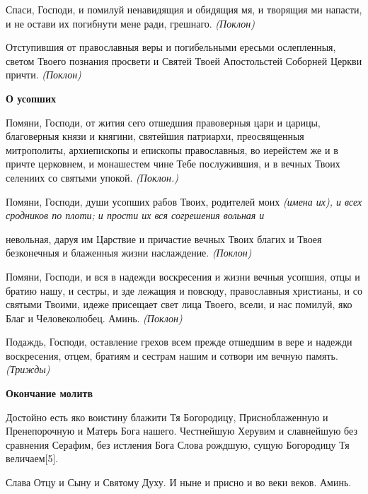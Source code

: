    Спаси, Господи, и помилуй ненавидящия и обидящия мя, и творящия ми
напасти, и не остави их погибнути мене ради, грешнаго. \itshape  (Поклон)\normalfont{}



   Отступившия от православныя веры и погибельными ересьми
ослепленныя, светом Твоего познания просвети и Святей Твоей Апостольстей
Соборней Церкви причти. \itshape  (Поклон) \normalfont{}



 

\bfseries О усопших\normalfont{}


   Помяни, Господи, от жития сего отшедшия правоверныя цари и царицы,
благоверныя князи и княгини, святейшия патриархи, преосвященныя
митрополиты, архиепископы и епископы православныя, во иерейстем же и в
причте церковнем, и монашестем чине Тебе послужившия, и в вечных Твоих
селениих со святыми упокой. \itshape  (Поклон.)\normalfont{}



   Помяни, Господи, души усопших рабов Твоих, родителей моих \itshape  (имена
их)\normalfont{}, и всех сродников по плоти; и прости их вся согрешения вольная и

невольная, даруя им Царствие и причастие вечных Твоих благих
и Твоея безконечныя и блаженныя жизни наслаждение. \itshape  (Поклон)
\normalfont{}



   Помяни, Господи, и вся в надежди воскресения и жизни вечныя усопшия,
отцы и братию нашу, и сестры, и зде лежащия и повсюду, православныя
христианы, и со святыми Твоими, идеже присещает свет лица Твоего,
всели, и нас помилуй, яко Благ и Человеколюбец. Аминь. \itshape  (Поклон)
\normalfont{}



   Подаждь, Господи, оставление грехов всем прежде отшедшим в вере и
надежди воскресения, отцем, братиям и сестрам нашим и сотвори им вечную
память. \itshape  (Трижды)\normalfont{}



 

\bfseries Окончание молитв\normalfont{}


   Достойно есть яко воистину блажити Тя Богородицу, Присноблаженную и
Пренепорочную и Матерь Бога нашего. Честнейшую Херувим и славнейшую без
сравнения Серафим, без истления Бога Слова рождшую, сущую Богородицу Тя
величаем[5].



   Слава Отцу и Сыну и Святому Духу. И ныне и присно и во веки веков.
Аминь.




